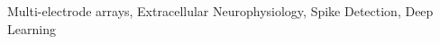 \begin{keywords}
Multi-electrode arrays, Extracellular Neurophysiology, Spike Detection, Deep Learning
\end{keywords}
\clearpage
\thispagestyle{empty}
\cleardoublepage
